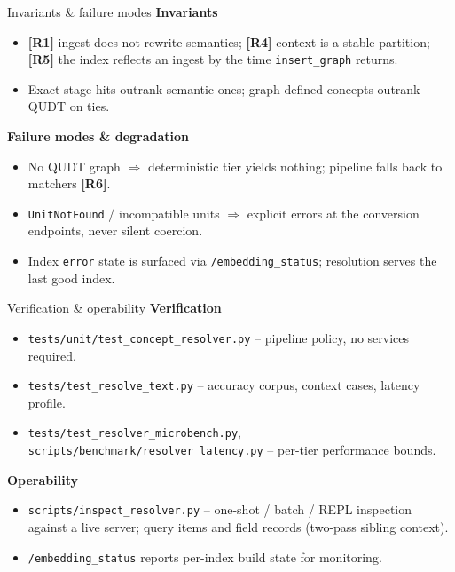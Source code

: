 \documentclass[aspectratio=169]{beamer}
\newcommand{\code}[1]{\texttt{\small #1}}
\newcommand{\req}[1]{\textbf{[#1]}}
\begin{document}
\begin{frame}{Invariants \& failure modes}
  \textbf{Invariants}
  \begin{itemize}
    \item \req{R1} ingest does not rewrite semantics; \req{R4} context is
          a stable partition; \req{R5} the index reflects an ingest by the
          time \code{insert\_graph} returns.
    \item Exact-stage hits outrank semantic ones; graph-defined concepts
          outrank QUDT on ties.
  \end{itemize}
  \textbf{Failure modes \& degradation}
  \begin{itemize}
    \item No QUDT graph $\Rightarrow$ deterministic tier yields nothing;
          pipeline falls back to matchers \req{R6}.
    \item \code{UnitNotFound} / incompatible units $\Rightarrow$ explicit
          errors at the conversion endpoints, never silent coercion.
    \item Index \code{error} state is surfaced via
          \code{/embedding\_status}; resolution serves the last good index.
  \end{itemize}
\end{frame}

\begin{frame}{Verification \& operability}
  \textbf{Verification}
  \begin{itemize}
    \item \code{tests/unit/test\_concept\_resolver.py} -- pipeline policy,
          no services required.
    \item \code{tests/test\_resolve\_text.py} -- accuracy corpus, context
          cases, latency profile.
    \item \code{tests/test\_resolver\_microbench.py},
          \code{scripts/benchmark/resolver\_latency.py} -- per-tier
          performance bounds.
  \end{itemize}
  \textbf{Operability}
  \begin{itemize}
    \item \code{scripts/inspect\_resolver.py} -- one-shot / batch / REPL
          inspection against a live server; query items and field records
          (two-pass sibling context).
    \item \code{/embedding\_status} reports per-index build state for
          monitoring.
  \end{itemize}
\end{frame}
\end{document}
